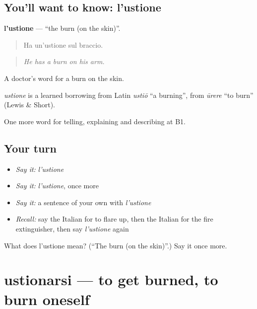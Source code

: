 \subsection*{You'll want to know: l'ustione}
\textbf{l'ustione} — \textquotedblleft{}the burn (on the skin)\textquotedblright{}.

\begin{quote}
Ha un'ustione sul braccio.
\end{quote}

\begin{quote}
\emph{He has a burn on his arm.}
\end{quote}

A doctor's word for a burn on the skin.

\begin{cousinweb}
\emph{ustione} is a learned borrowing from Latin \emph{ustiō} \textquotedblleft{}a burning\textquotedblright{}, from \emph{ūrere} \textquotedblleft{}to burn\textquotedblright{} (Lewis \& Short).
\end{cousinweb}

\begin{grammarlens}[title={What you've built}]
One more word for telling, explaining and describing at B1.
\end{grammarlens}

\subsection*{Your turn}
\begin{itemize}
\raggedright
  \item \emph{Say it:} \emph{l'ustione}
  \item \emph{Say it:} \emph{l'ustione}, once more
  \item \emph{Say it:} a sentence of your own with \emph{l'ustione}
  \item \emph{Recall:} say the Italian for to flare up, then the Italian for the fire extinguisher, then say \emph{l'ustione} again
\end{itemize}

\begin{tcolorbox}[breakable,colback=teal!4,colframe=teal!35!black,title={Before you move on}]
What does l'ustione mean? (\textquotedblleft{}The burn (on the skin)\textquotedblright{}.) Say it once more.
\end{tcolorbox}
\section[ustionarsi]{ustionarsi — to get burned, to burn oneself}

